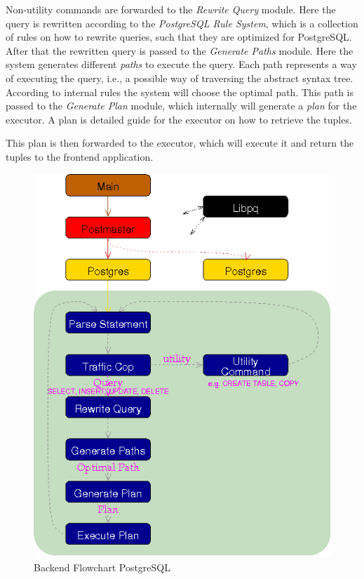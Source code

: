 Non-utility commands are forwarded to the \emph{Rewrite Query} module.
%
Here the query is rewritten according to the \emph{PostgreSQL Rule System}, which is a collection of rules on how to rewrite queries, such that they are optimized for PostgreSQL. 
%
After that the rewritten query is passed to the \emph{Generate Paths} module.
%
Here the system generates different \emph{paths} to execute the query.
%
Each path represents a way of executing the query, i.e., a possible way of traversing the abstract syntax tree.
%
According to internal rules the system will choose the optimal path.
%
This path is passed to the \emph{Generate Plan} module, which internally will generate a \emph{plan} for the executor.
%
A plan is detailed guide for the executor on how to retrieve the tuples.

This plan is then forwarded to the executor, which will execute it and return the tuples to the frontend application.
%
\begin{figure}[!ht]
  \centering
    \includegraphics[width=1\textwidth]{img/backend_flowchart.png}
    \caption{Backend Flowchart PostgreSQL \protect \footnotemark}\label{figure:postgresql:architecture}
\end{figure}
%
